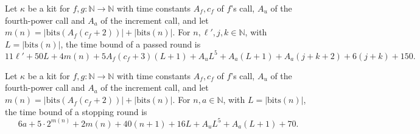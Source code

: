 \begin{definition}
\label{Turing.NTimeDiag.qyRndP}
\leanok
{}
Let $\kappa$ be a kit for $f, g : \mathbb{N} \to \mathbb{N}$ with time constants $A_f, c_f$ of
$f$'s call, $A_u$ of the fourth-power call and $A_a$ of the increment call, and let $m(n) =
|\mathrm{bits}(A_f(c_f + 2))| + |\mathrm{bits}(n)|$. For $n, \ell', j, k \in \mathbb{N}$, with $L =
|\mathrm{bits}(n)|$, the time bound of a passed round is \[ 11\ell' + 50L + 4m(n) + 5A_f(c_f + 3)(L
+ 1) + A_u L^5 + A_a(L + 1) + A_a(j + k + 2) + 6(j + k) + 150. \]
\end{definition}

\begin{definition}
\label{Turing.NTimeDiag.qyRndS}
\leanok
{}
Let $\kappa$ be a kit for $f, g : \mathbb{N} \to \mathbb{N}$ with time constants $A_f, c_f$ of
$f$'s call, $A_u$ of the fourth-power call and $A_a$ of the increment call, and let $m(n) =
|\mathrm{bits}(A_f(c_f + 2))| + |\mathrm{bits}(n)|$. For $n, a \in \mathbb{N}$, with $L =
|\mathrm{bits}(n)|$, the time bound of a stopping round is \[ 6a + 5 \cdot 2^{m(n)} + 2m(n) + 40(n
+ 1) + 16L + A_u L^5 + A_a(L + 1) + 70. \]
\end{definition}

